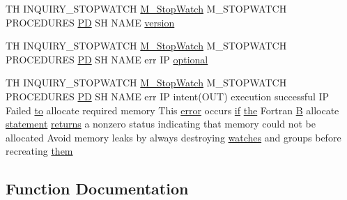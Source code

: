 \begin{DoxyCompactItemize}
TH I\+N\+Q\+U\+I\+R\+Y\+\_\+\+S\+T\+O\+P\+W\+A\+T\+CH \hyperlink{option__stopwatch_83_8txt_aa2011fc45a5e502e87ee50996a8a9305}{M\+\_\+\+Stop\+Watch} M\+\_\+\+S\+T\+O\+P\+W\+A\+T\+CH P\+R\+O\+C\+E\+D\+U\+R\+ES \hyperlink{what__overview_81_8txt_a85f26da5a4481fbdb0d9c79f2b94de3e}{PD} SH N\+A\+ME \hyperlink{inquiry__stopwatch_83_8txt_aee378be19d20935dd436517beda00ee4}{version}
\item 
TH I\+N\+Q\+U\+I\+R\+Y\+\_\+\+S\+T\+O\+P\+W\+A\+T\+CH \hyperlink{option__stopwatch_83_8txt_aa2011fc45a5e502e87ee50996a8a9305}{M\+\_\+\+Stop\+Watch} M\+\_\+\+S\+T\+O\+P\+W\+A\+T\+CH P\+R\+O\+C\+E\+D\+U\+R\+ES \hyperlink{what__overview_81_8txt_a85f26da5a4481fbdb0d9c79f2b94de3e}{PD} SH N\+A\+ME err IP \hyperlink{inquiry__stopwatch_83_8txt_ae6234c62ee65662c46e3ce6056a3f252}{optional}
\item 
TH I\+N\+Q\+U\+I\+R\+Y\+\_\+\+S\+T\+O\+P\+W\+A\+T\+CH \hyperlink{option__stopwatch_83_8txt_aa2011fc45a5e502e87ee50996a8a9305}{M\+\_\+\+Stop\+Watch} M\+\_\+\+S\+T\+O\+P\+W\+A\+T\+CH P\+R\+O\+C\+E\+D\+U\+R\+ES \hyperlink{what__overview_81_8txt_a85f26da5a4481fbdb0d9c79f2b94de3e}{PD} SH N\+A\+ME err IP intent(O\+UT) execution successful IP Failed \hyperlink{M__stopwatch_83_8txt_a97209fd3e34ef701c0a9734280779cbb}{to} allocate required memory This \hyperlink{M__stopwatch_83_8txt_ac4611edff506351be87ddb9adfc62315}{error} occurs \hyperlink{exit_87_8txt_a77395982f8d25581c808c40f3b634d90}{if} \hyperlink{M__stopwatch_83_8txt_a0f266597de2e57eb3aa964927bb30e14}{the} Fortran \hyperlink{intro__blas1_83_8txt_a5f157716d3fd55e7b7e08312dc859b58}{B} allocate \hyperlink{M__stopwatch_83_8txt_a43758526aa61bbaa49faf1e287658350}{statement} \hyperlink{M__stopwatch_83_8txt_aee54cdd5349bf498aa96e7f9426a0717}{returns} a nonzero status indicating that memory could not be allocated Avoid memory leaks by always destroying \hyperlink{M__stopwatch_83_8txt_a21c5980264dbe8d8a18083e2dd1ffaa9}{watches} and groups before recreating \hyperlink{inquiry__stopwatch_83_8txt_aba56042309c21e69313821cb6c092c35}{them}
\end{DoxyCompactItemize}


\subsection{Function Documentation}
\mbox{\label{inquiry__stopwatch_83_8txt_ab2e20a25f5ea8f5986290d5c6d860dac}} 
